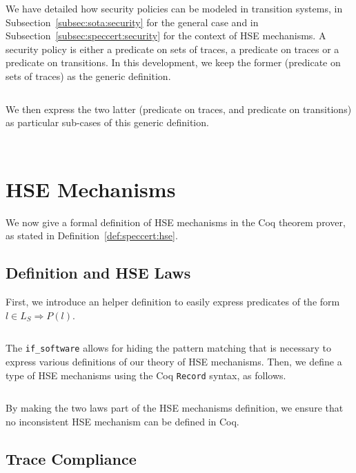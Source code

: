 We have detailed how security policies can be modeled in transition systems, in
Subsection~\ref{subsec:sota:security} for the general case and in
Subsection~\ref{subsec:speccert:security} for the context of HSE mechanisms.
%
A security policy is either a predicate on sets of traces, a predicate on
traces or a predicate on transitions.
%
In this development, we keep the former (predicate on sets of traces) as the
generic definition.

\inputminted[gobble=2,firstline=90,lastline=92]{coq}{Listings/SpecCert.v}

We then express the two latter (predicate on traces, and predicate on transitions)
as particular sub-cases of this generic definition.

\inputminted[gobble=2,firstline=94,lastline=99]{coq}{Listings/SpecCert.v}

\inputminted[gobble=2,firstline=101,lastline=110]{coq}{Listings/SpecCert.v}

\section{HSE Mechanisms}

We now give a formal definition of HSE mechanisms in the Coq theorem prover,
as stated in Definition~\ref{def:speccert:hse}.

\subsection{Definition and HSE Laws}

First, we introduce an helper definition to easily express predicates of the
form \( l \in L_S \Rightarrow P(l) \).

\inputminted[gobble=2,firstline=112,lastline=121]{coq}{Listings/SpecCert.v}

The \texttt{if\_software} allows for hiding the pattern matching that is
necessary to express various definitions of our theory of HSE mechanisms.
%
Then, we define a type of HSE mechanisms using the Coq \texttt{Record} syntax,
as follows.

\inputminted[gobble=2,firstline=123,lastline=139]{coq}{Listings/SpecCert.v}

By making the two laws part of the HSE mechanisms definition, we ensure that no
inconsistent HSE mechanism can be defined in Coq.

\subsection{Trace Compliance}

